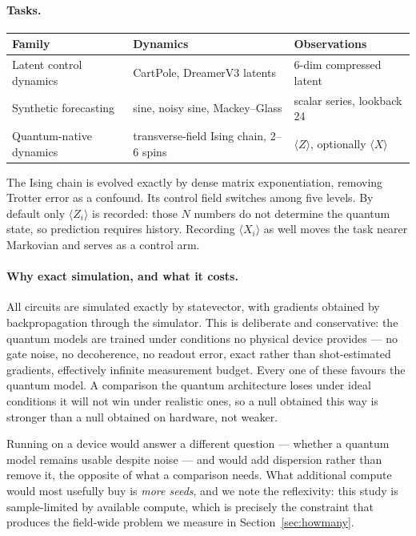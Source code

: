 \documentclass[11pt,onecolumn]{article}
\begin{document}
\paragraph{Tasks.}
\begin{table}[htb]\centering\small
\begin{tabular}{lll}
\toprule
Family & Dynamics & Observations \\
\midrule
Latent control dynamics & CartPole, DreamerV3 latents &
  6-dim compressed latent \\
Synthetic forecasting & sine, noisy sine, Mackey--Glass &
  scalar series, lookback 24 \\
Quantum-native dynamics & transverse-field Ising chain, 2--6 spins &
  $\langle Z \rangle$, optionally $\langle X \rangle$ \\
\bottomrule
\end{tabular}
\end{table}

The Ising chain is evolved exactly by dense matrix exponentiation,
removing Trotter error as a confound. Its control field switches among
five levels. By default only $\langle Z_i \rangle$ is recorded: those
$N$ numbers do not determine the quantum state, so prediction requires
history. Recording $\langle X_i \rangle$ as well moves the task nearer
Markovian and serves as a control arm.

\paragraph{Why exact simulation, and what it costs.}
All circuits are simulated exactly by statevector, with gradients
obtained by backpropagation through the simulator. This is deliberate
and conservative: the quantum models are trained under conditions no
physical device provides --- no gate noise, no decoherence, no readout
error, exact rather than shot-estimated gradients, effectively infinite
measurement budget. Every one of these favours the quantum model. A
comparison the quantum architecture loses under ideal conditions it will
not win under realistic ones, so a null obtained this way is stronger
than a null obtained on hardware, not weaker.

Running on a device would answer a different question --- whether a
quantum model remains usable despite noise --- and would add dispersion
rather than remove it, the opposite of what a comparison needs. What
additional compute would most usefully buy is \emph{more seeds}, and we
note the reflexivity: this study is sample-limited by available compute,
which is precisely the constraint that produces the field-wide problem
we measure in Section~\ref{sec:howmany}.
\end{document}
